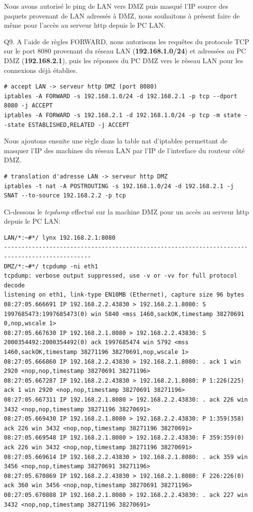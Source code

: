 \documentclass[frenchb, 11pt]{article}
\newlength{\leftbarwidth}
\newlength{\leftbarsep}
\newcommand*{\leftbarcolorcmd}{\color{leftbarcolor}} %
\renewenvironment{leftbar}{%
    \def\FrameCommand{{\leftbarcolorcmd{\vrule width \leftbarwidth\relax\hspace {\leftbarsep}}}}%
    \MakeFramed {\advance \hsize -\width \FrameRestore }%
}{%
    \endMakeFramed
}
\begin{document}
Nous avons autorisé le ping de LAN vers DMZ puis masqué l'IP source des paquets provenant de LAN adressés à DMZ, nous souhaitons à présent faire de même pour l'accès au serveur http depuis le PC LAN.

\begin{leftbar}
	\noindent Q9. A l'aide de règles FORWARD, nous autorisons les requêtes du protocole TCP sur le port 8080 provenant du réseau LAN (\textbf{192.168.1.0/24}) et adressées au PC DMZ (\textbf{192.168.2.1}), puis les réponses du PC DMZ vers le réseau LAN pour les connexions déjà établies.
	\begin{lstlisting}[numbers=none]
# accept LAN -> serveur http DMZ (port 8080)
iptables -A FORWARD -s 192.168.1.0/24 -d 192.168.2.1 -p tcp --dport 8080 -j ACCEPT
iptables -A FORWARD -s 192.168.2.1 -d 192.168.1.0/24 -p tcp -m state --state ESTABLISHED,RELATED -j ACCEPT
	\end{lstlisting}
	Nous ajoutons ensuite une règle dans la table nat d'iptables permettant de masquer l'IP des machines du réseau LAN par l'IP de l'interface du routeur côté DMZ.
	\begin{lstlisting}[numbers=none]
# translation d'adresse LAN -> serveur http DMZ
iptables -t nat -A POSTROUTING -s 192.168.1.0/24 -d 192.168.2.1 -j SNAT --to-source 192.168.2.2 -p tcp
	\end{lstlisting}
	Ci-dessous le \emph{tcpdump} effectué sur la machine DMZ pour un accès au serveur http depuis le PC LAN:
	\begin{lstlisting}[numbers=none]
LAN/*:~#*/ lynx 192.168.2.1:8080
-----------------------------------------------------------------------------------------------
DMZ/*:~#*/ tcpdump -ni eth1
tcpdump: verbose output suppressed, use -v or -vv for full protocol decode
listening on eth1, link-type EN10MB (Ethernet), capture size 96 bytes
08:27:05.666691 IP 192.168.2.2.43830 > 192.168.2.1.8080: S 1997685473:1997685473(0) win 5840 <mss 1460,sackOK,timestamp 38270691 0,nop,wscale 1>
08:27:05.667630 IP 192.168.2.1.8080 > 192.168.2.2.43830: S 2000354492:2000354492(0) ack 1997685474 win 5792 <mss 1460,sackOK,timestamp 38271196 38270691,nop,wscale 1>
08:27:05.666860 IP 192.168.2.2.43830 > 192.168.2.1.8080: . ack 1 win 2920 <nop,nop,timestamp 38270691 38271196>
08:27:05.667287 IP 192.168.2.2.43830 > 192.168.2.1.8080: P 1:226(225) ack 1 win 2920 <nop,nop,timestamp 38270691 38271196>
08:27:05.667311 IP 192.168.2.1.8080 > 192.168.2.2.43830: . ack 226 win 3432 <nop,nop,timestamp 38271196 38270691>
08:27:05.669430 IP 192.168.2.1.8080 > 192.168.2.2.43830: P 1:359(358) ack 226 win 3432 <nop,nop,timestamp 38271196 38270691>
08:27:05.669548 IP 192.168.2.1.8080 > 192.168.2.2.43830: F 359:359(0) ack 226 win 3432 <nop,nop,timestamp 38271196 38270691>
08:27:05.669614 IP 192.168.2.2.43830 > 192.168.2.1.8080: . ack 359 win 3456 <nop,nop,timestamp 38270691 38271196>
08:27:05.670869 IP 192.168.2.2.43830 > 192.168.2.1.8080: F 226:226(0) ack 360 win 3456 <nop,nop,timestamp 38270691 38271196>
08:27:05.670888 IP 192.168.2.1.8080 > 192.168.2.2.43830: . ack 227 win 3432 <nop,nop,timestamp 38271196 38270691>

	\end{lstlisting}
\end{leftbar}
\end{document}
